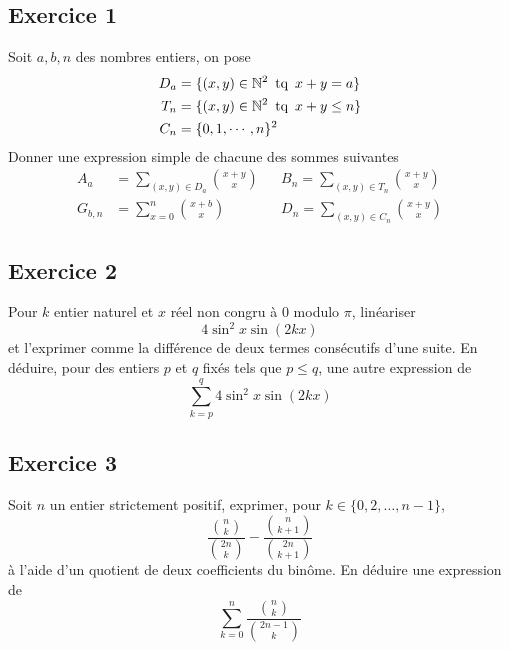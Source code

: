 
\subsection*{Exercice 1}
Soit $a,b,n$ des nombres entiers, on pose
\begin{align*}
D_a &= \{(x,y)\in \mathbb{N}^2 \, \text{ tq }\, x+y=a\}\\
T_n &= \{(x,y)\in \mathbb{N}^2 \, \text{ tq }\, x+y \leq n\}\\
C_n &= \{0,1,\cdots,n\}^2
\end{align*}
Donner une expression simple de chacune des sommes suivantes
\begin{align*}
A_a&=\sum_{(x,y)\in D_a}\binom{x+y}{x} & & B_n = \sum_{(x,y)\in T_n}\binom{x+y}{x}\\
G_{b,n}&= \sum_{x=0}^n\binom{x+b}{x}   & & D_n = \sum_{(x,y)\in C_n}\binom{x+y}{x}
\end{align*}

\subsection*{Exercice 2}
Pour $k$ entier naturel et $x$ réel non congru à $0$ modulo $\pi$, linéariser
\begin{displaymath}4\sin^2x\sin (2kx)\end{displaymath}
et l'exprimer comme la différence de deux termes consécutifs d'une suite. En déduire, pour des entiers $p$ et $q$ fixés tels que $p\leq q$, une autre expression de 
\begin{displaymath}\sum_{k=p}^{q}4\sin^2x\sin (2kx)\end{displaymath}

\subsection*{Exercice 3}
Soit $n$ un entier strictement positif, exprimer, pour $k\in\{0,2,\ldots,n-1\}$,
\begin{displaymath}\frac{\binom{n}{k}}{ \binom{2n}{k}}-\frac{\binom{n}{k+1}}{ \binom{2n}{k+1}}\end{displaymath}
{\`a} l'aide d'un quotient de deux coefficients du bin{\^o}me.\newline
En déduire une expression de
\begin{displaymath}\sum _{k=0}^{n}\frac{\binom{n}{k}}{ \binom{2n-1}{k}}\end{displaymath}
